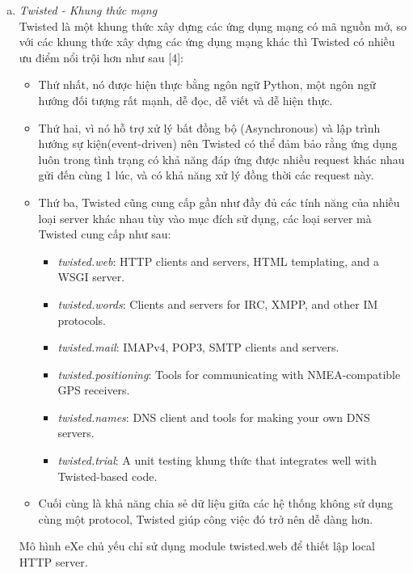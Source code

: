 \begin{enumerate}[a.]
	\item \textit{Twisted - Khung thức mạng}\\
	Twisted là một khung thức xây dựng các ứng dụng mạng có mã nguồn mở, so với các khung thức xây dựng các ứng dụng mạng khác thì Twisted có nhiều ưu điểm nổi trội hơn như sau [4]:
	
	\begin{itemize}
		\item Thứ nhất, nó được hiện thực bằng ngôn ngữ Python, một ngôn ngữ hướng đối tượng rất mạnh, dễ đọc, dễ viết và dễ hiện thực.
		
		\item Thứ hai, vì nó hỗ trợ xử lý bất đồng bộ (Asynchronous) và lập trình hướng sự kiện(event-driven) nên Twisted có thể đảm bảo rằng ứng dụng luôn trong tình trạng có khả năng đáp ứng được nhiều request khác nhau gửi đến cùng 1 lúc, và có khả năng xử lý đồng thời các request này.
		
		\item Thứ ba, Twisted cũng cung cấp gần như đầy đủ các tính năng của nhiều loại server khác nhau tùy vào mục đích sử dụng, các loại server mà Twisted cung cấp như sau:
		\begin{itemize}
			\item \textit{twisted.web}: HTTP clients and servers, HTML templating, and a WSGI server.
			\item \textit{twisted.words}: Clients and servers for IRC, XMPP, and other IM protocols.
			\item \textit{twisted.mail}: IMAPv4, POP3, SMTP clients and servers.
			\item \textit{twisted.positioning}: Tools for communicating with NMEA-compatible GPS receivers.
			\item \textit{twisted.names}: DNS client and tools for making your own DNS servers.
			\item \textit{twisted.trial}: A unit testing khung thức that integrates well with Twisted-based code.																							
		\end{itemize}
		
		\item Cuối cùng là khả năng chia sẻ dữ liệu giữa các hệ thống không sử dụng cùng một protocol, Twisted giúp công việc đó trở nên dễ dàng hơn.
	\end{itemize}
	
	Mô hình eXe chủ yếu chỉ sử dụng module twisted.web để thiết lập local HTTP server.
	

\end{enumerate}
